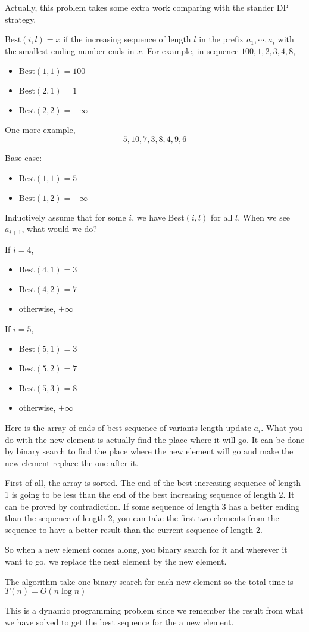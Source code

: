 Actually, this problem takes some extra work comparing with the stander DP strategy.

$\text{Best}(i,l) = x$ if the increasing sequence of length $l$ in the prefix $a_1, \cdots, a_i$ with the smallest ending number ends in $x$.
For example, in sequence $100, 1, 2, 3, 4, 8$,
\begin{itemize}
	\item $\text{Best}(1,1) = 100$
	\item $\text{Best}(2,1) = 1$
	\item $\text{Best}(2,2) = +\infty$
\end{itemize}

One more example, $$5, 10, 7, 3, 8, 4, 9, 6$$

Base case:
\begin{itemize}
	\item $\text{Best}(1,1) = 5$
	\item $\text{Best}(1,2) = +\infty$
\end{itemize}

Inductively assume that for some $i$, we have Best$(i, l)$ for all $l$.
When we see $a_{i+1}$, what would we do?

If $i = 4$,
\begin{itemize}
	\item $\text{Best}(4,1) = 3$
	\item $\text{Best}(4,2) = 7$
	\item otherwise, $+\infty$
\end{itemize}

If $i = 5$,
\begin{itemize}
	\item $\text{Best}(5,1) = 3$
	\item $\text{Best}(5,2) = 7$
	\item $\text{Best}(5,3) = 8$
	\item otherwise, $+\infty$
\end{itemize}

Here is the array of ends of best sequence of variants length update $a_i$. What you do with the new element is actually find the place where it will go. It can be done by binary search to find the place where the new element will go and make the new element replace the one after it. 

First of all, the array is sorted. The end of the best increasing sequence of length 1 is going to be less than the end of the best increasing sequence of length 2. It can be proved by contradiction. If some sequence of length 3 has a better ending than the sequence of length 2, you can take the first two elements from the sequence to have a better result than the current sequence of length 2.

So when a new element comes along, you binary search for it and wherever it want to go, we replace the next element by the new element.

The algorithm take one binary search for each new element so the total time is $T(n) = O(n\log n)$

This is a dynamic programming problem since we remember the result from what we have solved to get the best sequence for the a new element.


